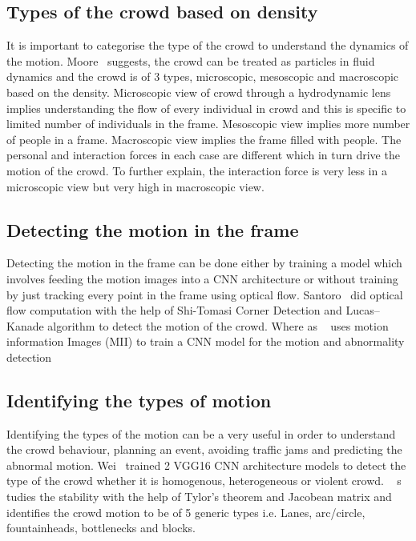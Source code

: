 \subsection{Types of the crowd based on density}
It is important to categorise the type of the crowd to understand the dynamics of the motion. 
Moore~\cite{moore2011visual} suggests, the crowd can be treated as particles in fluid dynamics and the 
crowd is of 3 types, microscopic, mesoscopic and macroscopic based on the density. Microscopic view 
of crowd through a hydrodynamic lens implies understanding the flow of every individual in crowd and 
this is specific to limited number of individuals in the frame. Mesoscopic view implies more number of 
people in a frame. Macroscopic view implies the frame filled with people. The personal and interaction 
forces in each case are different which in turn drive the motion of the crowd. To further explain, the 
interaction force is very less in a microscopic view but very high in macroscopic view.
\subsection{Detecting the motion in the frame}
Detecting the motion in the frame can be done either by training a model which involves feeding the 
motion images into a CNN architecture or without training by just tracking every point in the frame using 
optical flow. Santoro~\cite{santoro2010crowd} did optical flow computation with the help of Shi-Tomasi 
Corner Detection and Lucas–Kanade algorithm to detect the motion of the crowd. Where as 
~\cite{9078065} uses motion information Images (MII) to train a CNN model for the motion and abnormality detection
\subsection{Identifying the types of motion}
Identifying the types of the motion can be a very useful in order to understand the crowd behaviour, 
planning an event, avoiding traffic jams and predicting the abnormal motion. Wei~\cite{wei2020very} trained 2 VGG16 CNN 
architecture models to detect the type of the crowd whether it is homogenous, heterogeneous or violent crowd. ~\cite{solmaz2012identifying} s
tudies the stability with the help of Tylor's theorem and Jacobean matrix and identifies the crowd motion to be of 5 generic 
types i.e. Lanes, arc/circle, fountainheads, bottlenecks and blocks.

